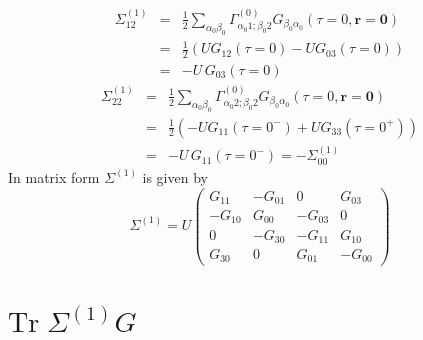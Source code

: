 \begin{eqnarray}
\Sigma^{(1)}_{12} & = &
\frac{1}{2}\sum_{\alpha_0\beta_0} \Gamma^{(0)}_{\alpha_0 1; \beta_0 2}
G_{\beta_0 \alpha_0}(\tau =0, \mathbf{r}=\mathbf{0}) \\
    & = & \frac{1}{2}\left(U G_{12}(\tau = 0) 
- U G_{03}(\tau = 0)\right) \\
    & = & -U\, G_{03}(\tau = 0)
\end{eqnarray}
\begin{eqnarray}
\Sigma^{(1)}_{22} & = &
\frac{1}{2}\sum_{\alpha_0\beta_0} \Gamma^{(0)}_{\alpha_0 2; \beta_0 2}
G_{\beta_0 \alpha_0}(\tau =0, \mathbf{r}=\mathbf{0}) \\
    & = & \frac{1}{2}\left(-U G_{11}(\tau = 0^-) + 
U G_{33}(\tau = 0^+)\right) \\
    & = & -U\, G_{11}(\tau = 0^-) = -\Sigma^{(1)}_{00} 
\end{eqnarray}
In matrix form $\Sigma^{(1)}$ is given by
\begin{equation}
\Sigma^{(1)} = 
U 
\begin{pmatrix}
G_{11} & -G_{01} & 0 & G_{03} \\
-G_{10} & G_{00} & -G_{03} & 0 \\
0  & -G_{30} & -G_{11} & G_{10} \\
G_{30} & 0 & G_{01} & -G_{00}
\end{pmatrix}
\end{equation}

\section{$\mathrm{Tr}\; \Sigma^{(1)} G$}


